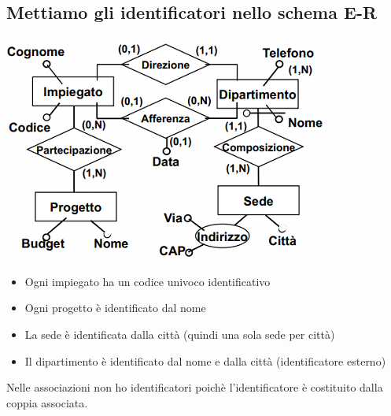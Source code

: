 \subsection{Mettiamo gli identificatori nello schema E-R}
\begin{center}\includegraphics{images/20.PNG}\end{center}
\begin{itemize}
	\item Ogni impiegato ha un codice univoco identificativo
	\item Ogni progetto è identificato dal nome
	\item La sede è identificata dalla città (quindi una sola sede per città)
	\item Il dipartimento è identificato dal nome e dalla città (identificatore esterno)
\end{itemize}
Nelle associazioni non ho identificatori poichè l'identificatore è costituito dalla coppia associata.
